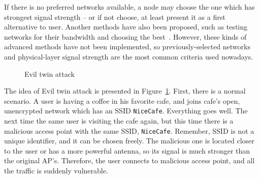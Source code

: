 \documentclass[12pt,a4paper,oneside,pdftex]{report}
\begin{document}
If there is no preferred networks available, a node may choose the one which has strongest signal strength -- or if not choose, at least present it as a first alternative to user. Another methods have also been proposed, such as testing networks for their bandwidth and choosing the best~\cite{Nicholson:2006:APselection}. However, these kinds of advanced methods have not been implemented, so previously-selected networks and physical-layer signal strength are the most common criteria used nowadays.

\begin{figure}
    \begin{center}
    \caption{Evil twin attack}
    \label{fig:evil_twin}
    \end{center}
\end{figure}

The idea of Evil twin attack is presented in Figure~\ref{fig:evil_twin}. First, there is a normal scenario. A user is having a coffee in his favorite cafe, and joins cafe's open, unencrypted network which has an SSID \texttt{NiceCafe}. Everything goes well. The next time the same user is visiting the cafe again, but this time there is a malicious access point with the same SSID, \texttt{NiceCafe}. Remember, SSID is not a unique identifier, and it can be chosen freely. The malicious one is located closer to the user or has a more powerful antenna, so its signal is much stronger than the original AP's. Therefore, the user connects to malicious access point, and all the traffic is suddenly vulnerable.
\end{document}
